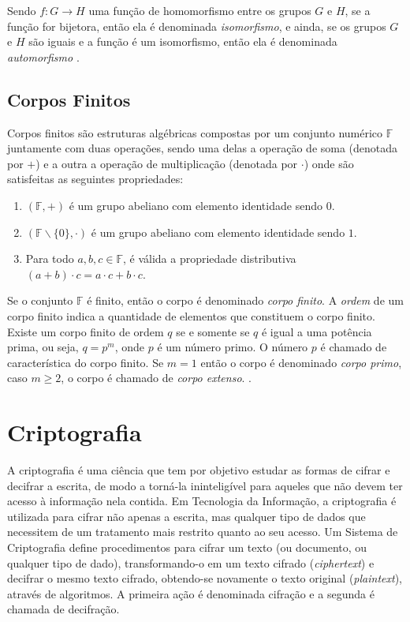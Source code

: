 Sendo $f: G \rightarrow H$ uma função de homomorfismo entre os grupos \(G\) e \(H\), se a função for bijetora, então ela é denominada \textit{isomorfismo}, e ainda, se os grupos \(G\) e \(H\) são iguais e a função é um isomorfismo, então ela é denominada \textit{automorfismo} \cite{Shokranian:2010}.

%
%
\subsection{Corpos Finitos}
Corpos finitos são estruturas algébricas compostas por um conjunto numérico \(\mathbb{F}\) juntamente com duas operações, sendo uma delas a operação de soma (denotada por $+$) e a outra a operação de multiplicação (denotada por $\cdot$) onde são satisfeitas as seguintes propriedades: \cite{Guide}

\begin{enumerate}
\item $(\mathbb{F}, +)$ é um grupo abeliano com elemento identidade sendo \(0\).
\item $(\mathbb{F} \backslash \{0\}, \cdot)$ é um grupo abeliano com elemento identidade sendo $1$.
\item Para todo $a, b, c \in \mathbb{F}$, é válida a propriedade distributiva $(a + b) \cdot c = a \cdot c + b \cdot c$.
\end{enumerate}

Se o conjunto \(\mathbb{F}\) é finito, então o corpo é denominado \textit{corpo finito}. A \textit{ordem} de um corpo finito indica a quantidade de elementos que constituem o corpo finito. Existe um corpo finito de ordem \(q\) se e somente se \(q\) é igual a uma potência prima, ou seja, $q = p^{m}$, onde \(p\) é um número primo. O número \(p\) é chamado de característica do corpo finito. Se $m = 1$ então o corpo é denominado \textit{corpo primo}, caso $m \geq 2$, o corpo é chamado de \textit{corpo extenso}. \cite{Guide}.

%
%
\section{Criptografia} \label{sec:criptografia}
A criptografia é uma ciência que tem por objetivo estudar as formas de cifrar e decifrar a escrita, de modo a torná-la ininteligível para aqueles que não devem ter acesso à informação nela contida. Em Tecnologia da Informação, a criptografia é utilizada para cifrar não apenas a escrita, mas qualquer tipo de dados que necessitem de um tratamento mais restrito quanto ao seu acesso. Um Sistema de Criptografia define procedimentos para cifrar um texto (ou documento, ou qualquer tipo de dado), transformando-o em um texto cifrado (\textit{ciphertext}) e decifrar o mesmo texto cifrado, obtendo-se novamente o texto original (\textit{plaintext}), através de algoritmos. A primeira ação é denominada cifração e a segunda é chamada de decifração. \cite{Portnoi:2005}

